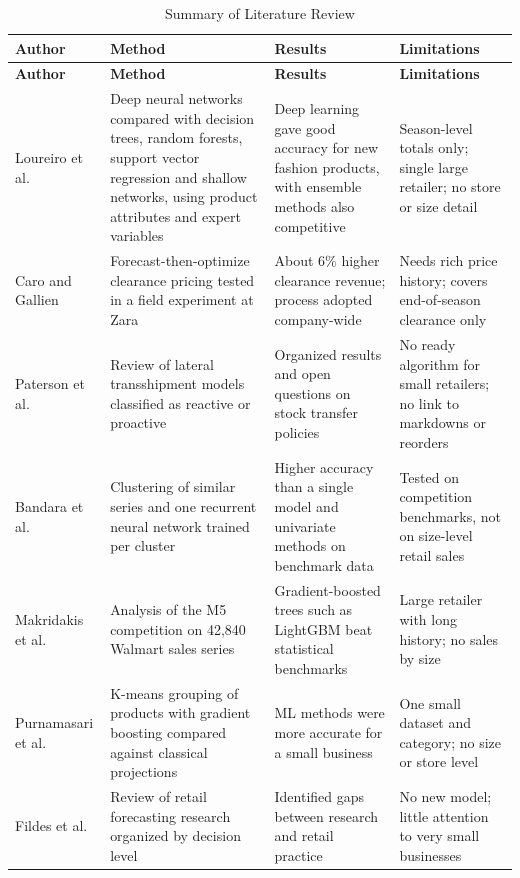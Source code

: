 \documentclass{StockSense}
\begin{document}
\begin{longtable}{|L{2.6cm}|L{4.1cm}|L{3.6cm}|L{3.4cm}|}
\caption{Summary of Literature Review}\label{tab:literature-review} \\
\hline
\textbf{Author} & \textbf{Method} & \textbf{Results} & \textbf{Limitations} \\ \hline
\endfirsthead
\hline
\textbf{Author} & \textbf{Method} & \textbf{Results} & \textbf{Limitations} \\ \hline
\endhead
\hline
\endfoot
Loureiro et al.~\cite{loureiro2018deep} & Deep neural networks compared with decision trees, random forests, support vector regression and shallow networks, using product attributes and expert variables & Deep learning gave good accuracy for new fashion products, with ensemble methods also competitive & Season-level totals only; single large retailer; no store or size detail \\ \hline
Caro and Gallien~\cite{caro2012clearance} & Forecast-then-optimize clearance pricing tested in a field experiment at Zara & About 6\% higher clearance revenue; process adopted company-wide & Needs rich price history; covers end-of-season clearance only \\ \hline
Paterson et al.~\cite{paterson2011inventory} & Review of lateral transshipment models classified as reactive or proactive & Organized results and open questions on stock transfer policies & No ready algorithm for small retailers; no link to markdowns or reorders \\ \hline
Bandara et al.~\cite{bandara2020forecasting} & Clustering of similar series and one recurrent neural network trained per cluster & Higher accuracy than a single model and univariate methods on benchmark data & Tested on competition benchmarks, not on size-level retail sales \\ \hline
Makridakis et al.~\cite{makridakis2022m5} & Analysis of the M5 competition on 42,840 Walmart sales series & Gradient-boosted trees such as LightGBM beat statistical benchmarks & Large retailer with long history; no sales by size \\ \hline
Purnamasari et al.~\cite{purnamasari2023demand} & K-means grouping of products with gradient boosting compared against classical projections & ML methods were more accurate for a small business & One small dataset and category; no size or store level \\ \hline
Fildes et al.~\cite{fildes2022retail} & Review of retail forecasting research organized by decision level & Identified gaps between research and retail practice & No new model; little attention to very small businesses \\ \hline

\end{longtable}
\end{document}
